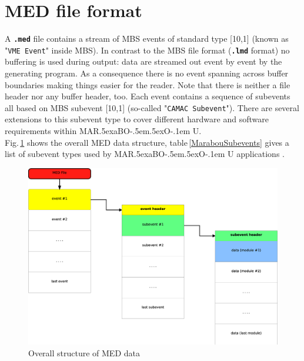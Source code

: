 \documentclass[10pt]{article}
\def\MARaBOU{MAR\lower.5ex\hbox{a}BO\kern-.5em\lower.5ex\hbox{O}\kern-.1em U}%
\begin{document}
\section{MED file format}
A \texttt{\textbf{.med}} file contains a stream of MBS events of standard type [10,1]
(known as "\texttt{VME Event}" inside MBS).
In contrast to the MBS file format (\texttt{\textbf{.lmd}} format) no buffering is used during output:
data are streamed out event by event by the generating program.
As a consequence there is no event spanning across buffer boundaries making things easier for the reader.
Note that there is neither a file header nor any buffer header, too.
Each event contains a sequence of subevents all based on MBS subevent [10,1] (so-called "\texttt{CAMAC Subevent}").
There are several extensions to this subevent type to cover different hardware and software requirements within \MARaBOU{}.\\
Fig.\,\ref{MedFileFormat} shows the overall MED data structure,
table\,\ref{MarabouSubevents} gives a list of subevent types used by \MARaBOU{} applications \cite{MarabouHomePage}.
\begin{figure}[H]
\centerline{\includegraphics[width=\linewidth]{MedFileStructure}}
\caption{Overall structure of MED data}
\label{MedFileFormat}
\end{figure} 
\end{document}
